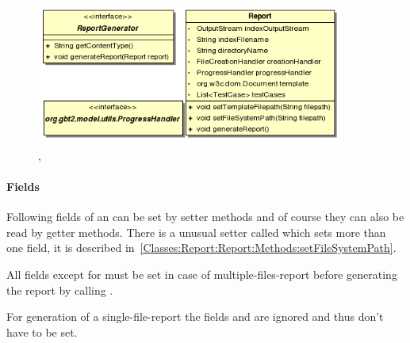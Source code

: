 \begin{figure}[hbtp]
 \centering
 \includegraphics[width=0.9\textwidth]{images/Report/Report.png}
 \caption{, }
 \label{figure:Classes:Report:Report}
\end{figure}


\paragraph{Fields} \label{Classes:Report:Report:Fields}

Following fields of an  can be set by setter methods and of course they can also be read by getter methods. There is a unusual setter called  which sets more than one field, it is described in~\ref{Classes:Report:Report:Methods:setFileSystemPath}.

All fields except for  must be set in case of multiple-files-report before generating the report by calling .

For generation of a single-file-report the fields  and  are ignored and thus don't have to be set.

